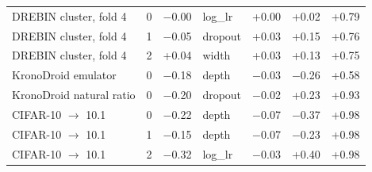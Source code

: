 \begin{table}[t]
\begin{tabular}{lrrlrrr}
DREBIN cluster, fold 4 & 0 & $-$0.00 & log\_lr & +0.00 & +0.02 & +0.79 \\
DREBIN cluster, fold 4 & 1 & $-$0.05 & dropout & +0.03 & +0.15 & +0.76 \\
DREBIN cluster, fold 4 & 2 & +0.04 & width & +0.03 & +0.13 & +0.75 \\
KronoDroid emulator & 0 & $-$0.18 & depth & $-$0.03 & $-$0.26 & +0.58 \\
KronoDroid natural ratio & 0 & $-$0.20 & dropout & $-$0.02 & +0.23 & +0.93 \\
CIFAR-10 $\rightarrow$ 10.1 & 0 & $-$0.22 & depth & $-$0.07 & $-$0.37 & +0.98 \\
CIFAR-10 $\rightarrow$ 10.1 & 1 & $-$0.15 & depth & $-$0.07 & $-$0.23 & +0.98 \\
CIFAR-10 $\rightarrow$ 10.1 & 2 & $-$0.32 & log\_lr & $-$0.03 & +0.40 & +0.98 \\
\bottomrule
\end{tabular}
\end{table}
